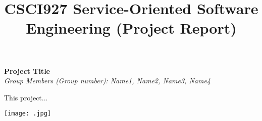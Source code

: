 \documentclass[runningheads]{llncs}
\begin{document}
\title{\large{CSCI927 Service-Oriented Software Engineering (Project Report)}}
\author{}
\institute{}
\maketitle
\vspace{-1cm}



\begin{center}
\Large{\textbf{Project Title}} \\ %
\vspace{0.2cm}
\large{\emph{Group Members (Group number): Name1, Name2, Name3, Name4}} \\%
\vspace{0.3cm}
\end{center}

\noindent This project...




\texttt{[image: .jpg]}\\\\
\end{document}
